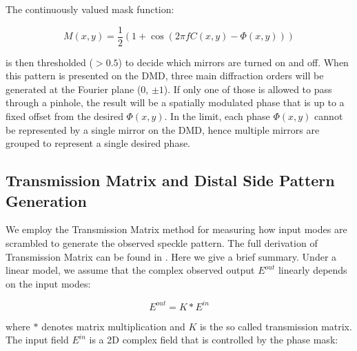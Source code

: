 \documentclass[10pt]{article}
\begin{document}
The continuously valued mask function: 

\[M\left( {x,y} \right) = \frac{1}{2}\left( {1 + \cos \left( {2\pi fC\left( {x,y} \right) - \Phi \left( {x,y} \right)} \right)} \right)\]

is then thresholded ($>0.5$) to decide which mirrors are turned on and off.
When this pattern is presented on the DMD, three main diffraction orders will be generated at the Fourier plane (0, $\pm1$). If only one of those is allowed to pass through a pinhole, the result will be a spatially modulated phase that is up to a fixed offset from the desired $\Phi \left( {x,y} \right)$. In the limit, each phase $\Phi \left( {x,y} \right)$ cannot be represented by a single mirror on the DMD, hence multiple mirrors are grouped to represent a single desired phase. 

\subsection{Transmission Matrix and Distal Side Pattern Generation}
We employ the Transmission Matrix method for measuring how input modes are scrambled to generate the observed speckle pattern. The full derivation of Transmission Matrix can be found in \cite{Popoff2010-um}. Here we give a brief summary. 
Under a linear model, we assume that the complex observed output $E^{out}$ linearly depends on the input modes: 

\[{E^{out}} = K*{E^{in}}\]

where $*$ denotes matrix multiplication and $K$ is the so called transmission matrix. The input field $E^{in}$ is a 2D complex field that is controlled by the phase mask:
\end{document}
